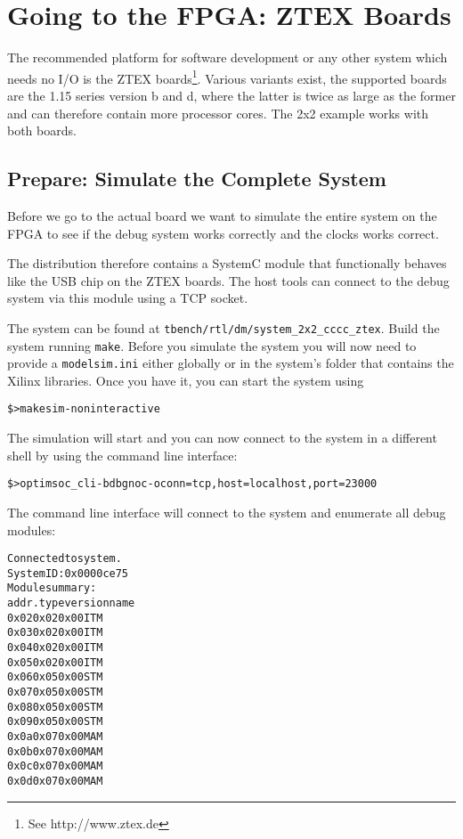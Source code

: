 \section{Going to the FPGA: ZTEX Boards}

The recommended platform for software development or any other system
which needs no I/O is the ZTEX boards\footnote{See
  http://www.ztex.de}. Various variants exist, the supported boards
are the 1.15 series version b and d, where the latter is twice as
large as the former and can therefore contain more processor cores.
The 2x2 example works with both boards.

\subsection{Prepare: Simulate the Complete System}
\label{subsection:2x2_ztex_simulate_complete_system}

Before we go to the actual board we want to simulate the entire system
on the FPGA to see if the debug system works correctly and the
clocks works correct.

The distribution therefore contains a SystemC module that functionally
behaves like the USB chip on the ZTEX boards. The host tools can
connect to the debug system via this module using a TCP socket.

The system can be found at \verb|tbench/rtl/dm/system_2x2_cccc_ztex|.
Build the system running \verb|make|. Before you simulate the system
you will now need to provide a \verb|modelsim.ini| either globally or
in the system's folder that contains the Xilinx libraries. Once you
have it, you can start the system using

\begin{alltt}
\$> make sim-noninteractive
\end{alltt}

The simulation will start and you can now connect
to the system in a different shell by using the command line
interface:

\begin{alltt}
\$> optimsoc_cli -bdbgnoc -oconn=tcp,host=localhost,port=23000
\end{alltt}

The command line interface will connect to the system and enumerate
all debug modules:

\begin{alltt}
Connected to system.
System ID: 0x0000ce75
Module summary:
addr.	type	version	name
0x02	0x02	0x00	ITM
0x03	0x02	0x00	ITM
0x04	0x02	0x00	ITM
0x05	0x02	0x00	ITM
0x06	0x05	0x00	STM
0x07	0x05	0x00	STM
0x08	0x05	0x00	STM
0x09	0x05	0x00	STM
0x0a	0x07	0x00	MAM
0x0b	0x07	0x00	MAM
0x0c	0x07	0x00	MAM
0x0d	0x07	0x00	MAM
\end{alltt}

